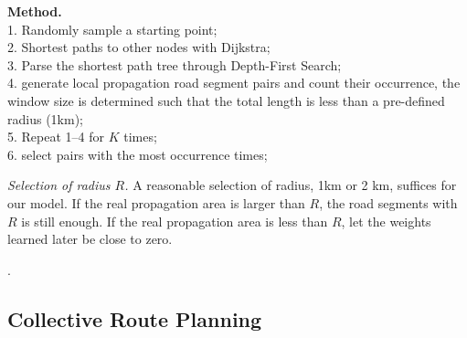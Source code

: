 {\bf Method.} \\
1. Randomly sample a starting point; \\
2. Shortest paths to other nodes with Dijkstra; \\
3. Parse the shortest path tree through Depth-First Search; \\
4. generate local propagation road segment pairs and count their occurrence, the window size is determined such that the total length is less than a pre-defined radius (1km); \\
5. Repeat 1--4 for $K$ times; \\
6. select pairs with the most occurrence times;

{\em Selection of radius $R$.} A reasonable selection of radius, \eg 1km or 2 km, suffices for our model. If the real propagation area is larger than $R$, the road segments with $R$ is still enough. If the real propagation area is less than $R$, let the weights learned later be close to zero.

.



\subsection{Collective Route Planning}
\label{subsec-route}

